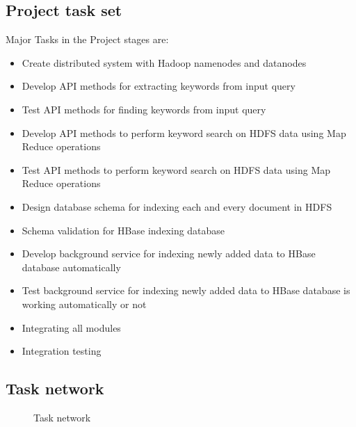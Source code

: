 \documentclass[oneside,a4paper,12pt]{report}
\begin{document}
\subsection{Project task set}  
Major Tasks in the Project stages are: 
\begin{itemize}
\item Create distributed system with Hadoop namenodes and datanodes
\item Develop API methods for extracting keywords from input query
\item Test API methods for finding keywords from input query
\item Develop API methods to perform keyword search on HDFS data using Map Reduce operations
\item Test API methods to perform keyword search on HDFS data using Map Reduce operations
\item Design database schema for indexing each and every document in HDFS
\item Schema validation for HBase indexing database
\item Develop background service for indexing newly added data to HBase database automatically
\item Test background service for indexing newly added data to HBase database is working automatically or not
\item Integrating all modules
\item Integration testing
\end{itemize}

\subsection{Task network}  
\begin{center}
	\begin{figure}[!htbp]
		\centering
	  \caption{Task network}
	  \label{fig:usecase}
	\end{figure}
\end{center}  
\end{document}
